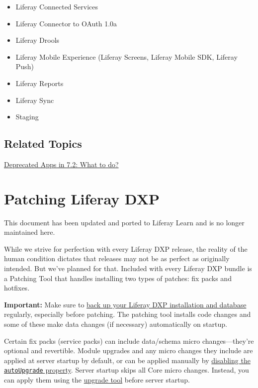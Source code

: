 \begin{itemize}
\tightlist
\item
  Liferay Connected Services
\item
  Liferay Connector to OAuth 1.0a
\item
  Liferay Drools
\item
  Liferay Mobile Experience (Liferay Screens, Liferay Mobile SDK,
  Liferay Push)
\item
  Liferay Reports
\item
  Liferay Sync
\item
  Staging
\end{itemize}

\section{Related Topics}\label{related-topics-2}

\href{/docs/7-2/deploy/-/knowledge_base/d/deprecated-apps-in-7-2-what-to-do}{Deprecated
Apps in 7.2: What to do?}

\chapter{Patching Liferay DXP}\label{patching-liferay-dxp}

{This document has been updated and ported to Liferay Learn and is no
longer maintained here.}

While we strive for perfection with every Liferay DXP release, the
reality of the human condition dictates that releases may not be as
perfect as originally intended. But we've planned for that. Included
with every Liferay DXP bundle is a Patching Tool that handles installing
two types of patches: fix packs and hotfixes.

\noindent\hrulefill

\textbf{Important:} Make sure to
\href{/docs/7-2/deploy/-/knowledge_base/d/backing-up-a-liferay-installation}{back
up your Liferay DXP installation and database} regularly, especially
before patching. The patching tool installs code changes and some of
these make data changes (if necessary) automatically on startup.

Certain fix packs (service packs) can include data/schema micro
changes---they're optional and revertible. Module upgrades and any micro
changes they include are applied at server startup by default, or can be
applied manually by
\href{/docs/7-2/deploy/-/knowledge_base/d/configuring-the-data-upgrade\#configuring-non-core-module-data-upgrades}{disabling
the \texttt{autoUpgrade} property}. Server startup skips all Core micro
changes. Instead, you can apply them using the
\href{/docs/7-2/deploy/-/knowledge_base/d/upgrading-to-product-ver}{upgrade
tool} before server startup.

